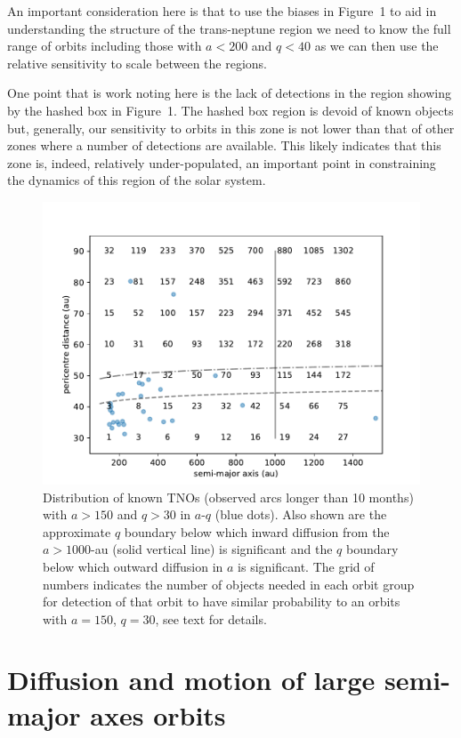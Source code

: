 \documentclass{aastex62}
\begin{document}
An important consideration here is that to use the biases in Figure~1 to aid in understanding the structure of the trans-neptune region we need to know the full range of orbits including those with $a< 200$ and $q<40$ as we can then use the relative sensitivity to scale between the regions. 

One point that is work noting here is the lack of detections in the region showing by the hashed box in Figure~1.  The hashed box region is devoid of known objects but, generally, our sensitivity to orbits in this zone is not lower than that of other zones where a number of detections are available.  This likely indicates that this zone is, indeed, relatively under-populated, an important point in constraining the dynamics of this region of the solar system.

\begin{figure}
\centering
\includegraphics[width=\textwidth]{figure1.pdf}
\caption{Distribution of known TNOs (observed arcs longer than 10 months) with $a > 150$ and $q > 30$ in $a$-$q$ (blue dots).  Also shown are the approximate $q$ boundary below which inward diffusion from the $a > 1000$-au (solid vertical line)  is significant and the $q$ boundary below which outward diffusion in $a$ is significant. The grid of numbers indicates the number of objects needed in each orbit group for detection of that orbit to have similar probability to an orbits with $a = 150$, $q = 30$, see text for details.}
\label{fig:bias}
\end{figure}

\section{Diffusion and motion of large semi-major axes orbits}
\end{document}
